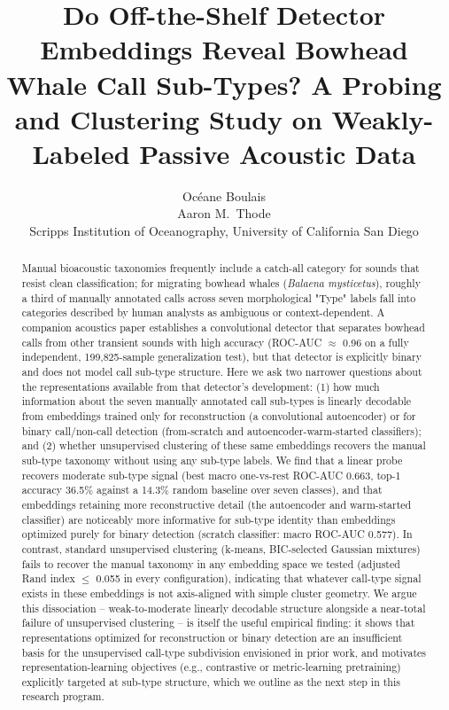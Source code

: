 \documentclass{article}
\title{Do Off-the-Shelf Detector Embeddings Reveal Bowhead Whale Call
Sub-Types? A Probing and Clustering Study on Weakly-Labeled Passive
Acoustic Data}
\author{%
  Oc\'eane Boulais \\
  \And
  Aaron M.\ Thode \\
  Scripps Institution of Oceanography, University of California San Diego \\
}
\begin{document}
\maketitle

\begin{abstract}
Manual bioacoustic taxonomies frequently include a catch-all category for
sounds that resist clean classification; for migrating bowhead whales
(\emph{Balaena mysticetus}), roughly a third of manually annotated calls
across seven morphological "Type" labels fall into categories described by
human analysts as ambiguous or context-dependent. A companion acoustics
paper establishes a convolutional detector that separates bowhead calls
from other transient sounds with high accuracy (ROC-AUC $\approx$ 0.96 on
a fully independent, 199,825-sample generalization test), but that
detector is explicitly binary and does not model call sub-type structure.
Here we ask two narrower questions about the representations available
from that detector's development: (1) how much information about the
seven manually annotated call sub-types is linearly decodable from
embeddings trained only for reconstruction (a convolutional autoencoder)
or for binary call/non-call detection (from-scratch and
autoencoder-warm-started classifiers); and (2) whether unsupervised
clustering of these same embeddings recovers the manual sub-type taxonomy
without using any sub-type labels. We find that a linear probe recovers
moderate sub-type signal (best macro one-vs-rest ROC-AUC 0.663, top-1
accuracy 36.5\% against a 14.3\% random baseline over seven classes), and
that embeddings retaining more reconstructive detail (the autoencoder and
warm-started classifier) are noticeably more informative for sub-type
identity than embeddings optimized purely for binary detection (scratch
classifier: macro ROC-AUC 0.577). In contrast, standard unsupervised
clustering (k-means, BIC-selected Gaussian mixtures) fails to recover the
manual taxonomy in any embedding space we tested (adjusted Rand index
$\leq$ 0.055 in every configuration), indicating that whatever call-type
signal exists in these embeddings is not axis-aligned with simple cluster
geometry. We argue this dissociation -- weak-to-moderate linearly
decodable structure alongside a near-total failure of unsupervised
clustering -- is itself the useful empirical finding: it shows that
representations optimized for reconstruction or binary detection are an
insufficient basis for the unsupervised call-type subdivision envisioned
in prior work, and motivates representation-learning objectives (e.g.,
contrastive or metric-learning pretraining) explicitly targeted at
sub-type structure, which we outline as the next step in this research
program.
\end{abstract}
\end{document}
